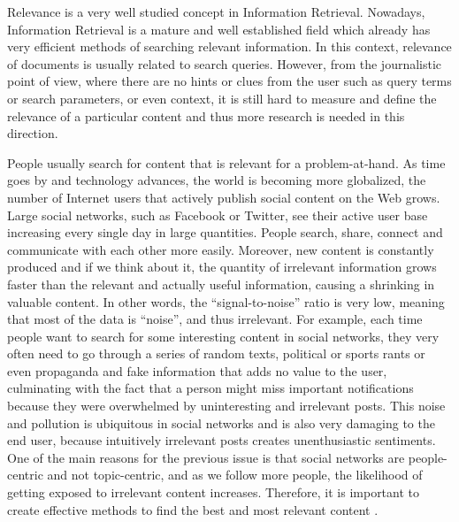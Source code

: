 Relevance is a very well studied concept in Information Retrieval. Nowadays, Information Retrieval is a mature and well established field which already has very efficient methods of searching relevant information. In this context, relevance of documents is usually related to search queries. However, from the journalistic point of view, where there are no hints or clues from the user such as query terms or search parameters, or even context, it is still hard to measure and define the relevance of a particular content and thus more research is needed in this direction. 

People usually search for content that is relevant for a problem-at-hand. As time goes by and technology advances, the world is becoming more globalized, the number of Internet users that actively publish social content on the Web grows. Large social networks, such as Facebook or Twitter, see their active user base increasing every single day in large quantities. People search, share, connect and communicate with each other more easily. Moreover, new content is constantly produced and if we think about it, the quantity of irrelevant information grows faster than the relevant and actually useful information, causing a shrinking in valuable content. In other words, the ``signal-to-noise'' ratio is very low, meaning that most of the data is ``noise'', and thus irrelevant. For example, each time people want to search for some interesting content in social networks, they very often need to go through a series of random texts, political or sports rants or even propaganda and fake information that adds no value to the user, culminating with the fact that a person might miss important notifications because they were overwhelmed by uninteresting and irrelevant posts. This noise and pollution is ubiquitous in social networks and is also very damaging to the end user, because intuitively irrelevant posts creates unenthusiastic sentiments. \\
One of the main reasons for the previous issue is that social networks are people-centric and not topic-centric, and as we follow more people, the likelihood of getting exposed to irrelevant content increases. %
Therefore, it is important to create effective methods to find the best and most relevant content \citep{FacebookCrisis,IrrelevantBigData}.

